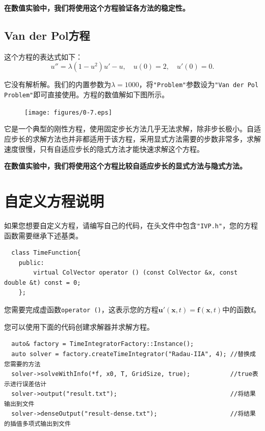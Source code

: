 \documentclass[lang=cn,10pt,bibend=bibtex]{elegantbook}
\begin{document}
\textbf{在数值实验中，我们将使用这个方程验证各方法的稳定性。}

\subsection{Van der Pol方程}

这个方程的表达式如下：
\begin{equation}
  u''=\lambda (1-u^2)u'-u,\quad u(0)=2,\quad u'(0)=0.
\end{equation}

它没有解析解。我们的内置参数为$\lambda=1000$，将\verb|"Problem"|参数设为\verb|"Van der Pol Problem"|即可直接使用。方程的数值解如下图所示。

\begin{figure}[H]
  \centering
  \texttt{[image: figures/0-7.eps]}
\end{figure}

它是一个典型的刚性方程，使用固定步长方法几乎无法求解，除非步长极小。自适应步长的求解方法也并非都适用于该方程，采用显式方法需要的步数非常多，求解速度很慢，只有自适应步长的隐式方法才能快速求解这个方程。

\textbf{在数值实验中，我们将使用这个方程比较自适应步长的显式方法与隐式方法。}

\section{自定义方程说明}

如果您想要自定义方程，请编写自己的代码，在头文件中包含\verb|"IVP.h"|，您的方程函数需要继承下述基类。
\begin{lstlisting}
  class TimeFunction{
    public:
        virtual ColVector operator () (const ColVector &x, const double &t) const = 0;
    };
\end{lstlisting}

您需要完成虚函数\verb|operator ()|，这表示您的方程$\mathbf{u}'(\mathbf{x},t)=\mathbf{f}(\mathbf{x},t)$中的函数$\mathbf{f}$。

您可以使用下面的代码创建求解器并求解方程。
\begin{lstlisting}
  auto& factory = TimeIntegratorFactory::Instance();
  auto solver = factory.createTimeIntegrator("Radau-IIA", 4); //替换成您需要的方法
  solver->solveWithInfo(*f, x0, T, GridSize, true);           //true表示进行误差估计
  solver->output("result.txt");                               //将结果输出到文件
  solver->denseOutput("result-dense.txt");                    //将结果的插值多项式输出到文件
\end{lstlisting}
\end{document}
